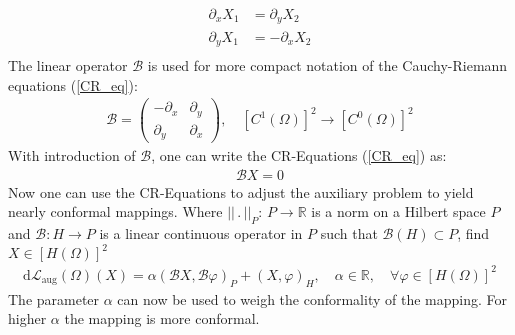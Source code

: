 \begin{equation}\label{CR_eq}
	\begin{aligned}
		\partial_x X_1 &= \partial_y X_2 \\
		\partial_y X_1 &= -\partial_x X_2 \\
	\end{aligned}
\end{equation}
The linear operator $\mathcal{B}$ is used for more compact notation of the 
Cauchy-Riemann equations (\ref{CR_eq}):
\begin{equation}\label{CR_B}
	\begin{aligned}
		\mathcal{B} = 
		\begin{pmatrix}
			-\partial_x & \partial_y\\
			\partial_y & \partial_x
		\end{pmatrix} ,\quad [C^1(\Omega)]^2 \rightarrow [C^0(\Omega)]^2
	\end{aligned}
\end{equation}
With introduction of $\mathcal{B}$, one can write the CR-Equations (\ref{CR_eq}) as:
\begin{align*}
	\mathcal{B}X=0
\end{align*}
Now one can use the CR-Equations to adjust the auxiliary problem to yield nearly conformal 
mappings. Where $|| \, . \, ||_P: \, P \rightarrow \mathbb{R}$ is a
norm on a Hilbert space $P$ and $\mathcal{B}:H \rightarrow P$ is a linear continuous operator 
in $P$  such that $\mathcal{B}(H) \subset P$, find $X \in [H(\Omega)]^2$
\begin{align}\label{eq_conf_aux}
	\mathrm{d}\mathcal{L}_{\mathrm{aug}}(\Omega)(X) = \alpha (\mathcal{B}X,\mathcal{B}\varphi)_P
	+ (X,\varphi)_H, \quad \alpha \in \mathbb{R}, \quad \forall \varphi \in [H(\Omega)]^2
\end{align}
The parameter $\alpha$ can now be used to weigh the conformality of the mapping. For higher 
$\alpha$ the mapping is more conformal.


